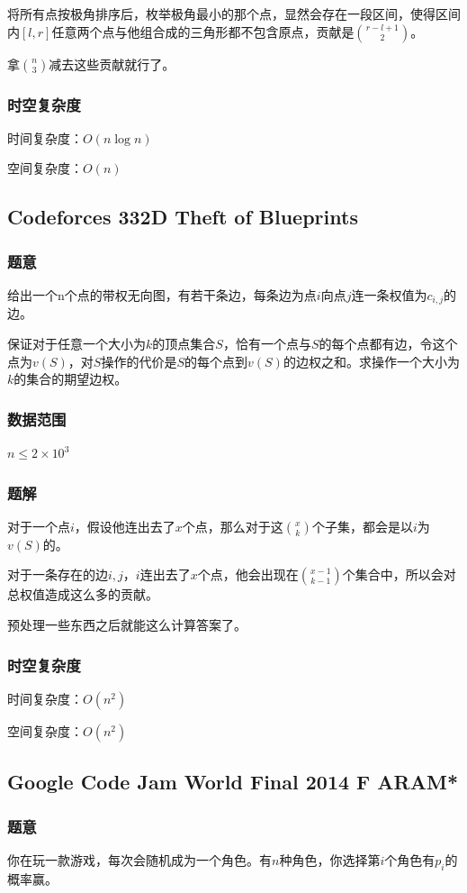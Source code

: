 \documentclass{ctexart}
\begin{document}
将所有点按极角排序后，枚举极角最小的那个点，显然会存在一段区间，使得区间内$[l,r]$任意两个点与他组合成的三角形都不包含原点，贡献是${{r-l+1} \choose 2}$。

拿${n \choose 3}$减去这些贡献就行了。
\subsubsection{时空复杂度}
时间复杂度：$O(n \log n)$

空间复杂度：$O(n)$
\subsection{Codeforces 332D Theft of Blueprints}
\subsubsection{题意}
给出一个n个点的带权无向图，有若干条边，每条边为点$i$向点$j$连一条权值为$c_{i,j}$的边。

保证对于任意一个大小为$k$的顶点集合$S$，恰有一个点与$S$的每个点都有边，令这个点为$v(S)$，对$S$操作的代价是$S$的每个点到$v(S)$的边权之和。求操作一个大小为$k$的集合的期望边权。
\subsubsection{数据范围}
$n \le 2 \times 10^3$
\subsubsection{题解}
对于一个点$i$，假设他连出去了$x$个点，那么对于这${x \choose k}$个子集，都会是以$i$为$v(S)$的。

对于一条存在的边$i,j$，$i$连出去了$x$个点，他会出现在${{x-1} \choose {k-1}}$个集合中，所以会对总权值造成这么多的贡献。

预处理一些东西之后就能这么计算答案了。
\subsubsection{时空复杂度}
时间复杂度：$O(n^2)$

空间复杂度：$O(n^2)$
\subsection{Google Code Jam World Final 2014 F ARAM*}
\subsubsection{题意}
你在玩一款游戏，每次会随机成为一个角色。有$n$种角色，你选择第$i$个角色有$p_i$的概率赢。
\end{document}
